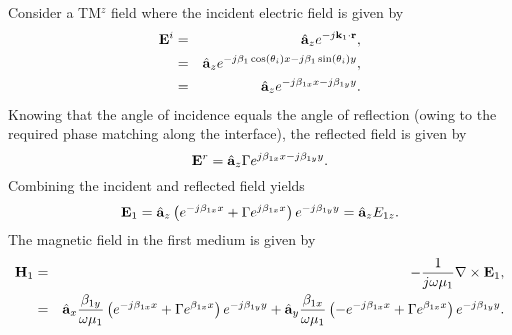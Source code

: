 Consider a TM$^z$ field where the incident electric field is given by
\begin{eqnarray}
  \mathbf{E}^i &=& \hat{\mathbf{a}}_{z} e^{-j\mathbf{k}_1\cdot\mathbf{r}}, \\
      &=& \hat{\mathbf{a}}_{z} e^{-j\beta_1\cos(\theta_i)x -j\beta_1\sin(\theta_i)y}, \\
      &=& \hat{\mathbf{a}}_{z} e^{-j\beta_{1x}x -j\beta_{1y}y}.
\end{eqnarray}
Knowing that the angle of incidence equals the angle of reflection
(owing to the required phase matching along the interface), the
reflected field is given by
\begin{equation}
  \mathbf{E}^r  = \hat{\mathbf{a}}_{z} \Gamma e^{j\beta_{1x}x -j\beta_{1y}y}.
\end{equation}
Combining the incident and reflected field yields
\begin{equation}
  \mathbf{E}_1  = \hat{\mathbf{a}}_{z} 
             \left( e^{-j\beta_{1x}x} + \Gamma e^{j\beta_{1x}x}\right)
            e^{-j\beta_{1y}y}
           = \hat{\mathbf{a}}_{z} E_{1z}.
\end{equation}
The magnetic field in the first medium is given by
\begin{eqnarray}
  \mathbf{H}_1 &=& -\frac{1}{j\omega\mu_1}\nabla\times\mathbf{E}_1, \\
    &=& \hat{\mathbf{a}}_{x}\frac{\beta_{1y}}{\omega\mu_1}
      \left(e^{-j\beta_{1x}x} + \Gamma e^{\beta_{1x}x}\right)
      e^{-j\beta_{1y}y}
    + \hat{\mathbf{a}}_{y}\frac{\beta_{1x}}{\omega\mu_1}
      \left(-e^{-j\beta_{1x}x} + \Gamma e^{\beta_{1x}x}\right)
      e^{-j\beta_{1y}y}.
\end{eqnarray}

